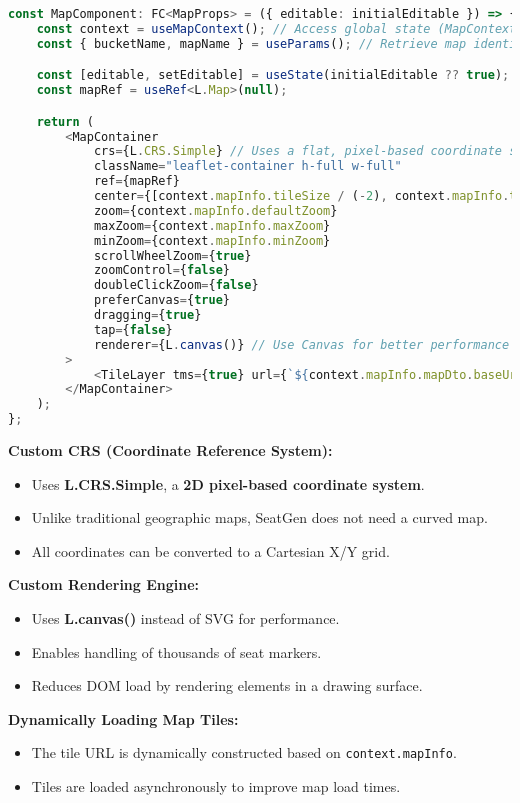 \begin{lstlisting}[language=TypeScript, caption=Initializing Leaflet Map in React, label=lst:react-leaflet]
const MapComponent: FC<MapProps> = ({ editable: initialEditable }) => {
    const context = useMapContext(); // Access global state (MapContext.tsx)
    const { bucketName, mapName } = useParams(); // Retrieve map identifiers from URL params

    const [editable, setEditable] = useState(initialEditable ?? true);
    const mapRef = useRef<L.Map>(null);

    return (
        <MapContainer
            crs={L.CRS.Simple} // Uses a flat, pixel-based coordinate system
            className="leaflet-container h-full w-full"
            ref={mapRef}
            center={[context.mapInfo.tileSize / (-2), context.mapInfo.tileSize / (2)]}
            zoom={context.mapInfo.defaultZoom}
            maxZoom={context.mapInfo.maxZoom}
            minZoom={context.mapInfo.minZoom}
            scrollWheelZoom={true}
            zoomControl={false}
            doubleClickZoom={false}
            preferCanvas={true}
            dragging={true}
            tap={false}
            renderer={L.canvas()} // Use Canvas for better performance
        >
            <TileLayer tms={true} url={`${context.mapInfo.mapDto.baseUrl}/{z}/{x}/{y}.png`} />
        </MapContainer>
    );
};
\end{lstlisting}

\textbf{Custom CRS (Coordinate Reference System):}
\begin{itemize}
    \item Uses \textbf{L.CRS.Simple}, a \textbf{2D pixel-based coordinate system}.
    \item Unlike traditional geographic maps, SeatGen does not need a curved map.
    \item All coordinates can be converted to a Cartesian X/Y grid.
\end{itemize}

\textbf{Custom Rendering Engine:}
\begin{itemize}
    \item Uses \textbf{L.canvas()} instead of SVG for performance.
    \item Enables handling of thousands of seat markers.
    \item Reduces DOM load by rendering elements in a drawing surface.
\end{itemize}

\textbf{Dynamically Loading Map Tiles:}
\begin{itemize}
    \item The tile URL is dynamically constructed based on \texttt{context.mapInfo}.
    \item Tiles are loaded asynchronously to improve map load times.
\end{itemize}


